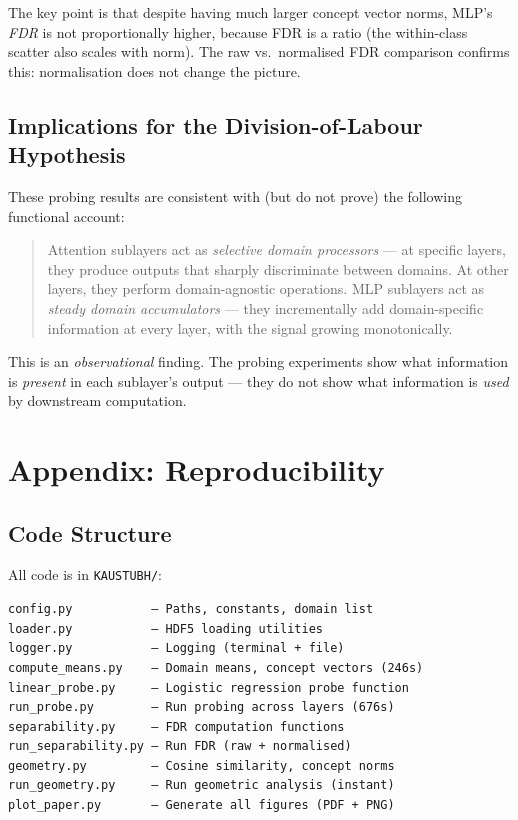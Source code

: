 \documentclass[11pt]{article}
\begin{document}
The key point is that despite having much larger concept vector norms, MLP's \emph{FDR} is not proportionally higher, because FDR is a ratio (the within-class scatter also scales with norm). The raw vs.\ normalised FDR comparison confirms this: normalisation does not change the picture.

\subsection{Implications for the Division-of-Labour Hypothesis}

These probing results are consistent with (but do not prove) the following functional account:

\begin{quote}
    Attention sublayers act as \emph{selective domain processors} --- at specific layers, they produce outputs that sharply discriminate between domains. At other layers, they perform domain-agnostic operations. MLP sublayers act as \emph{steady domain accumulators} --- they incrementally add domain-specific information at every layer, with the signal growing monotonically.
\end{quote}

This is an \emph{observational} finding. The probing experiments show what information is \emph{present} in each sublayer's output --- they do not show what information is \emph{used} by downstream computation.

\newpage
\section{Appendix: Reproducibility}
\label{app:repro}

\subsection{Code Structure}

All code is in \texttt{KAUSTUBH/}:

\begin{verbatim}
config.py           — Paths, constants, domain list
loader.py           — HDF5 loading utilities
logger.py           — Logging (terminal + file)
compute_means.py    — Domain means, concept vectors (246s)
linear_probe.py     — Logistic regression probe function
run_probe.py        — Run probing across layers (676s)
separability.py     — FDR computation functions
run_separability.py — Run FDR (raw + normalised)
geometry.py         — Cosine similarity, concept norms
run_geometry.py     — Run geometric analysis (instant)
plot_paper.py       — Generate all figures (PDF + PNG)
\end{verbatim}
\end{document}
